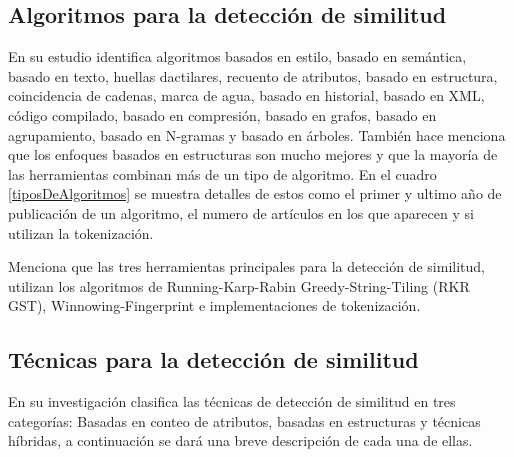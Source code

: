 \subsection{Algoritmos para la detección de similitud}
En su estudio \cite{Novak2019} identifica algoritmos basados en estilo, basado en semántica, basado en texto, huellas dactilares, recuento de atributos, basado en estructura, coincidencia de cadenas, marca de agua, basado en historial, basado en XML, código compilado, basado en compresión, basado en grafos, basado en agrupamiento, basado en N-gramas y basado en árboles. También hace menciona que los enfoques basados en estructuras son mucho mejores y que la mayoría de las herramientas combinan más de un tipo de algoritmo. En el cuadro \ref{tiposDeAlgoritmos} se muestra detalles de estos como el primer y ultimo año de publicación de un algoritmo, el numero de artículos en los que aparecen y si utilizan la tokenización.



\cite{Novak2019} Menciona que las tres herramientas principales para la detección de similitud, utilizan los algoritmos de Running-Karp-Rabin Greedy-String-Tiling (RKR GST), Winnowing-Fingerprint e implementaciones de tokenización.
\subsection{Técnicas para la detección de similitud}
En su investigación \cite{Karnalim2019} clasifica las técnicas de detección de similitud en tres categorías: Basadas en conteo de atributos, basadas en estructuras y técnicas híbridas, a continuación se dará una breve descripción de cada una de ellas.

